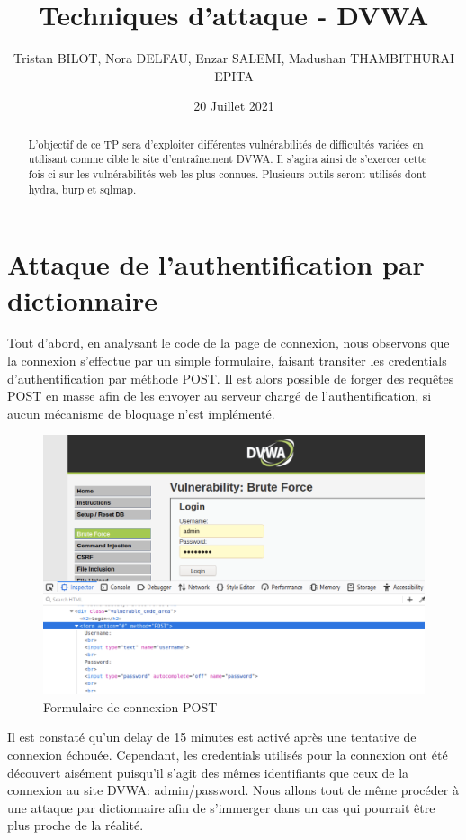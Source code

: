 \documentclass[12pt, oneside]{article}
\begin{document}
\title{Techniques d'attaque - DVWA}
\author{Tristan BILOT, Nora DELFAU, Enzar SALEMI, Madushan THAMBITHURAI\\EPITA}
\date{20 Juillet 2021}
\maketitle

\begin{abstract}
L'objectif de ce TP sera d'exploiter différentes vulnérabilités de difficultés variées en utilisant comme cible le site d'entraînement DVWA. Il s'agira ainsi de s'exercer cette fois-ci sur les vulnérabilités web les plus connues. Plusieurs outils seront utilisés dont hydra, burp et sqlmap.
\end{abstract}

\section{Attaque de l'authentification par dictionnaire}
Tout d'abord, en analysant le code de la page de connexion, nous observons que la connexion s'effectue par un simple formulaire, faisant transiter les credentials d'authentification par méthode POST. Il est alors possible de forger des requêtes POST en masse afin de les envoyer au serveur chargé de l'authentification, si aucun mécanisme de bloquage n'est implémenté.

\begin{figure}[H]
\centering
\includegraphics[scale=0.4]{1}
\caption{Formulaire de connexion POST}
\end{figure}

Il est constaté qu'un delay de 15 minutes est activé après une tentative de connexion échouée. Cependant, les credentials utilisés pour la connexion ont été découvert aisément puisqu'il s'agit des mêmes identifiants que ceux de la connexion au site DVWA: admin/password.
Nous allons tout de même procéder à une attaque par dictionnaire afin de s'immerger dans un cas qui pourrait être plus proche de la réalité.
\end{document}
